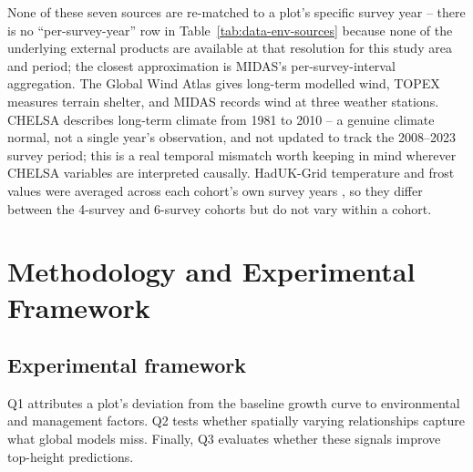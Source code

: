 \documentclass[logo,msc,ai]{infthesis}           %
\begin{document}
None of these seven sources are re-matched to a plot's specific survey year -- there is no
``per-survey-year'' row in Table~\ref{tab:data-env-sources} because none of the underlying
external products are available at that resolution for this study area and period; the closest
approximation is MIDAS's per-survey-interval aggregation. The Global Wind Atlas gives long-term
modelled wind, TOPEX measures terrain shelter, and MIDAS records wind at three weather stations.
CHELSA describes long-term climate from 1981 to 2010 \cite{karger2017CHELSA_C3_LID} -- a genuine
climate normal, not a single year's observation, and not updated to track the 2008--2023 survey
period; this is a real temporal mismatch worth keeping in mind wherever CHELSA variables are
interpreted causally. HadUK-Grid temperature and frost values were averaged across each cohort's
own survey years \cite{hollis2019HadUKGrid_C3_LID}, so they differ between the 4-survey and
6-survey cohorts but do not vary within a cohort.


\chapter{Methodology and Experimental Framework} \label{ch:methodology}
\section{Experimental framework}
Q1 attributes a plot's deviation from the baseline growth curve to environmental and management factors. Q2 tests whether spatially varying relationships capture what global models miss. Finally, Q3 evaluates whether these signals improve top-height predictions.
\end{document}

